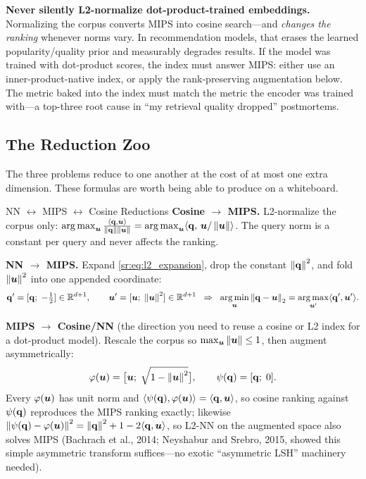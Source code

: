 \begin{warningbox}
\textbf{Never silently L2-normalize dot-product-trained embeddings.} Normalizing the corpus converts MIPS into cosine search---and \emph{changes the ranking} whenever norms vary. In recommendation models, that erases the learned popularity/quality prior and measurably degrades results. If the model was trained with dot-product scores, the index must answer MIPS: either use an inner-product-native index, or apply the rank-preserving augmentation below. The metric baked into the index must match the metric the encoder was trained with---a top-three root cause in ``my retrieval quality dropped'' postmortems.
\end{warningbox}

\subsection{The Reduction Zoo}

The three problems reduce to one another at the cost of at most one extra dimension. These formulas are worth being able to produce on a whiteboard.

\begin{mathresult}{NN $\leftrightarrow$ MIPS $\leftrightarrow$ Cosine Reductions}
\textbf{Cosine $\to$ MIPS.} L2-normalize the corpus only:
$\operatorname*{arg\,max}_{\bm{u}} \frac{\langle\mathbf{q},\bm{u}\rangle}{\left\lVert\mathbf{q}\right\rVert\left\lVert\bm{u}\right\rVert} = \operatorname*{arg\,max}_{\bm{u}} \langle\mathbf{q},\,\bm{u}/\left\lVert\bm{u}\right\rVert\rangle$.
The query norm is a constant per query and never affects the ranking.

\textbf{NN $\to$ MIPS.} Expand \eqref{sr:eq:l2_expansion}, drop the constant $\left\lVert\mathbf{q}\right\rVert^2$, and fold $\left\lVert\bm{u}\right\rVert^2$ into one appended coordinate:
\begin{equation}
\mathbf{q}' = [\mathbf{q};\; -\tfrac{1}{2}] \in \mathbb{R}^{d+1}, \qquad
\bm{u}' = [\bm{u};\; \left\lVert\bm{u}\right\rVert^2] \in \mathbb{R}^{d+1}
\;\;\Rightarrow\;\;
\operatorname*{arg\,min}_{\bm{u}}\left\lVert\mathbf{q}-\bm{u}\right\rVert_2 = \operatorname*{arg\,max}_{\bm{u}'} \langle\mathbf{q}',\bm{u}'\rangle.
\end{equation}

\textbf{MIPS $\to$ Cosine/NN} (the direction you need to reuse a cosine or L2 index for a dot-product model). Rescale the corpus so $\max_{\bm{u}}\left\lVert\bm{u}\right\rVert \le 1$, then augment asymmetrically:
\begin{equation}
\varphi(\bm{u}) = \big[\bm{u};\; \sqrt{1 - \left\lVert\bm{u}\right\rVert^2}\big], \qquad
\psi(\mathbf{q}) = [\mathbf{q};\; 0].
\end{equation}
Every $\varphi(\bm{u})$ has unit norm and $\langle\psi(\mathbf{q}),\varphi(\bm{u})\rangle = \langle\mathbf{q},\bm{u}\rangle$, so cosine ranking against $\psi(\mathbf{q})$ reproduces the MIPS ranking exactly; likewise $\left\lVert\psi(\mathbf{q})-\varphi(\bm{u})\right\rVert^2 = \left\lVert\mathbf{q}\right\rVert^2 + 1 - 2\langle\mathbf{q},\bm{u}\rangle$, so L2-NN on the augmented space also solves MIPS (Bachrach et al., 2014; Neyshabur and Srebro, 2015, showed this simple asymmetric transform suffices---no exotic ``asymmetric LSH'' machinery needed).
\end{mathresult}

